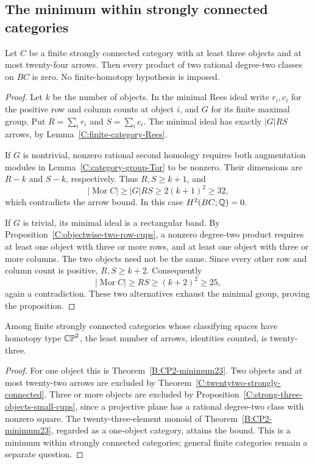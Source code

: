 \subsection{The minimum within strongly connected categories}

\begin{proposition}\label{C:strong-three-objects-small-cups}
Let $C$ be a finite strongly connected category with at least
three objects and at most twenty-four arrows. Then every product
of two rational degree-two classes on $BC$ is zero.
No finite-homotopy hypothesis is imposed.
\end{proposition}
\begin{proof}
Let $k$ be the number of objects. In the minimal Rees ideal write
$r_i,c_i$ for the positive row and column counts at object $i$,
and $G$ for its finite maximal group. Put
$R=\sum_i r_i$ and $S=\sum_i c_i$. The minimal ideal has exactly
$|G|RS$ arrows, by Lemma~\ref{C:finite-category-Rees}.

If $G$ is nontrivial, nonzero rational second homology requires
both augmentation modules in
Lemma~\ref{C:category-group-Tor} to be nonzero. Their dimensions
are $R-k$ and $S-k$, respectively. Thus $R,S\geq k+1$, and
\[
 |\operatorname{Mor}C|\geq |G|RS
 \geq2(k+1)^2\geq32,
\]
which contradicts the arrow bound. In this case $H^2(BC;\mathbb Q)=0$.

If $G$ is trivial, its minimal ideal is a rectangular band.
By Proposition~\ref{C:objectwise-two-row-cups}, a nonzero
degree-two product requires at least one object with three or
more rows, and at least one object with three or more columns.
The two objects need not be the same. Since every other row
and column count is positive, $R,S\geq k+2$. Consequently
\[
 |\operatorname{Mor}C|\geq RS\geq(k+2)^2\geq25,
\]
again a contradiction. These two alternatives exhaust the
minimal group, proving the proposition.
\end{proof}

\begin{corollary}\label{C:strong-category-CP2-minimum23}
Among finite strongly connected categories whose classifying
spaces have homotopy type $\mathbb {CP}^2$, the least number of arrows,
identities counted, is twenty-three.
\end{corollary}
\begin{proof}
For one object this is Theorem~\ref{B:CP2-minimum23}.
Two objects and at most twenty-two arrows are excluded by
Theorem~\ref{C:twentytwo-strongly-connected}. Three or more
objects are excluded by
Proposition~\ref{C:strong-three-objects-small-cups}, since a
projective plane has a rational degree-two class with nonzero
square. The twenty-three-element monoid of
Theorem~\ref{B:CP2-minimum23}, regarded as a one-object category,
attains the bound. This is a minimum within strongly connected
categories; general finite categories remain a separate question.
\end{proof}
